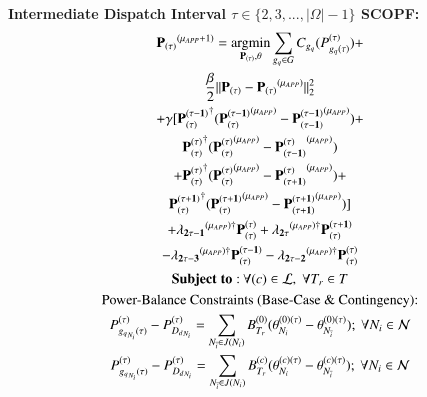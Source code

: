 \documentclass[preprint,12pt,3p]{elsarticle}
\begin{document}
\textbf{Intermediate Dispatch Interval $\tau \in \{2,3,...,|\Omega|-1\}$ SCOPF:}
\begin{subequations}\label{Look-Ahead_General_Second_Interval_Angle}
\begin{gather}
\mathbf{P_{(\tau)}}^{(\mu_{APP}+1)}=\argmin_{\mathbf{P_{(\tau)}},\theta} \sum_{{g_q}\in G}C_{g_q}(P_{{g_q}(\tau)}^{(\tau)})+\notag\\\frac{\beta}{2}||\mathbf{P_{(\tau)}}-\mathbf{P_{(\tau)}}^{(\mu_{APP})}||_2^2\notag\\+\gamma[\mathbf{P_{(\tau)}^{(\tau-1)}}^{\dagger}(\mathbf{P_{(\tau)}^{(\tau-1)}}^{(\mu_{APP})}-\mathbf{P_{(\tau-1)}^{(\tau-1)}}^{(\mu_{APP})})+\notag\\\mathbf{P_{(\tau)}^{(\tau)}}^{\dagger}(\mathbf{P_{(\tau)}^{(\tau)}}^{(\mu_{APP})}-\mathbf{P_{(\tau-1)}^{(\tau)}}^{(\mu_{APP})})\notag\\+\mathbf{P_{(\tau)}^{(\tau)}}^{\dagger}(\mathbf{P_{(\tau)}^{(\tau)}}^{(\mu_{APP})}-\mathbf{P_{(\tau+1)}^{(\tau)}}^{(\mu_{APP})})+\notag\\\mathbf{P_{(\tau)}^{(\tau+1)}}^{\dagger}(\mathbf{P_{(\tau)}^{(\tau+1)}}^{(\mu_{APP})}-\mathbf{P_{(\tau+1)}^{(\tau+1)}}^{(\mu_{APP})})]\notag\\+ \mathbf{\lambda_{2\tau-1}}^{(\mu_{APP})\dagger}\mathbf{P_{(\tau)}^{(\tau)}}+\mathbf{\lambda_{2\tau}}^{(\mu_{APP})\dagger}\mathbf{P_{(\tau)}^{(\tau+1)}}\notag\\-\mathbf{\lambda_{2\tau-3}}^{(\mu_{APP})\dagger}\mathbf{P_{(\tau)}^{(\tau-1)}}-\mathbf{\lambda_{2\tau-2}}^{(\mu_{APP})\dagger}\mathbf{P_{(\tau)}^{(\tau)}}\label{first_Look-Ahead_General_Second_Interval_Angle}\\
\mathbf{Subject\;to:}\:\forall(c)\in\mathcal{L},\;\forall T_r\in T\notag\\
\text{Power-Balance Constraints (Base-Case \& Contingency):}\notag\\
P_{{g_q}_{N_i}(\tau)}^{(\tau)}-P_{{D_d}_{N_i}}^{(\tau)}=\sum_{N_{\overline{i}}\in{J(N_i)}}B_{T_r}^{(0)}(\theta_{N_i}^{(0)(\tau)}-\theta_{N_{\overline{i}}}^{(0)(\tau)});\ \forall{{N_i}\in\mathcal{N}}\label{second_Look-Ahead_General_Second_Interval_Angle}\\
P_{{g_q}_{N_i}(\tau)}^{(\tau)}-P_{{D_d}_{N_i}}^{(\tau)}=\sum_{N_{\overline{i}}\in{J(N_i)}}B_{T_r}^{(c)}(\theta_{N_i}^{(c)(\tau)}-\theta_{N_{\overline{i}}}^{(c)(\tau)});\ \forall{{N_i}\in\mathcal{N}}\label{secondA_Look-Ahead_General_Second_Interval_Angle}\\

\end{gather}
\end{subequations}
\end{document}
